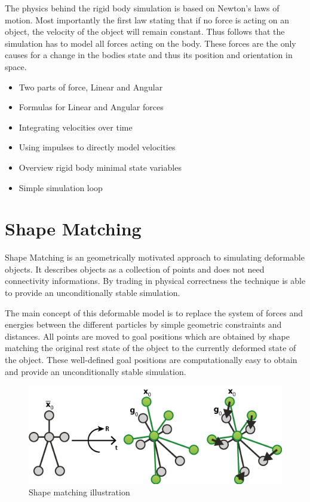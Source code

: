 The physics behind the rigid body simulation is based on Newton's laws of motion. Most importantly the first law stating that if no force is acting on an object, the velocity of the object will remain constant. Thus follows that the simulation has to model all forces acting on the body. These forces are the only causes for a change in the bodies state and thus its position and orientation in space.

\begin{itemize}
\item Two parts of force, Linear and Angular
\item Formulas for Linear and Angular forces
\item Integrating velocities over time
\item Using impulses to directly model velocities
\item Overview rigid body minimal state variables
\item Simple simulation loop
\end{itemize}

\section{Shape Matching}
\label{sec:shape_matching}

Shape Matching is an geometrically motivated approach to simulating deformable objects. It describes objects as a collection of points and does not need connectivity informations. By trading in physical correctness the technique is able to provide an unconditionally stable simulation. 

The main concept of this deformable model is to replace the system of forces and energies between the different particles by simple geometric constraints and distances. All points are moved to goal positions which are obtained by shape matching the original rest state of the object to the currently deformed state of the object. These well-defined goal positions are computationally easy to obtain and provide an unconditionally stable simulation.

\begin{figure}[h]
\centering
\includegraphics[scale=0.75]{images/shape_matching.png}
\caption{Shape matching illustration}
\label{img:shape_matching}
\end{figure}

